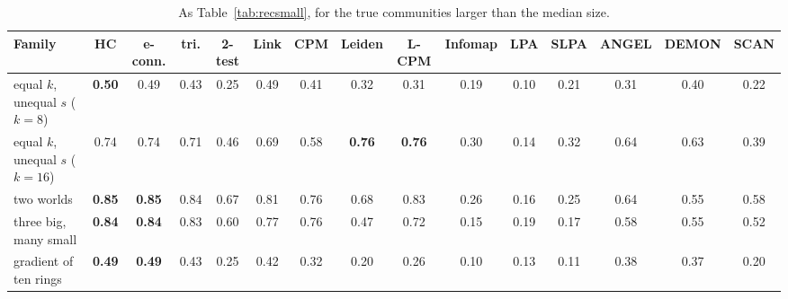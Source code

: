 \begin{table}[t]
\caption{As Table~\ref{tab:recsmall}, for the true communities larger than the median size.}
\label{tab:reclarge}
\scriptsize\setlength{\tabcolsep}{2pt}
\begin{ruledtabular}
\begin{tabular}{lcccccccccccccc}
Family & HC & e-conn. & tri. & 2-test & Link & CPM & Leiden & L-CPM & Infomap & LPA & SLPA & ANGEL & DEMON & SCAN \\
\hline
equal $k$, unequal $s$ ($k{=}8$) & \textbf{0.50} & 0.49 & 0.43 & 0.25 & 0.49 & 0.41 & 0.32 & 0.31 & 0.19 & 0.10 & 0.21 & 0.31 & 0.40 & 0.22 \\
equal $k$, unequal $s$ ($k{=}16$) & 0.74 & 0.74 & 0.71 & 0.46 & 0.69 & 0.58 & \textbf{0.76} & \textbf{0.76} & 0.30 & 0.14 & 0.32 & 0.64 & 0.63 & 0.39 \\
two worlds & \textbf{0.85} & \textbf{0.85} & 0.84 & 0.67 & 0.81 & 0.76 & 0.68 & 0.83 & 0.26 & 0.16 & 0.25 & 0.64 & 0.55 & 0.58 \\
three big, many small & \textbf{0.84} & \textbf{0.84} & 0.83 & 0.60 & 0.77 & 0.76 & 0.47 & 0.72 & 0.15 & 0.19 & 0.17 & 0.58 & 0.55 & 0.52 \\
gradient of ten rings & \textbf{0.49} & \textbf{0.49} & 0.43 & 0.25 & 0.42 & 0.32 & 0.20 & 0.26 & 0.10 & 0.13 & 0.11 & 0.38 & 0.37 & 0.20 \\
\end{tabular}
\end{ruledtabular}
\end{table}
